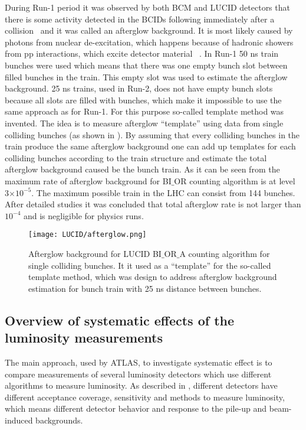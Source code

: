 During Run-1 period it was observed by both BCM and LUCID detectors that there is some activity detected in the BCIDs following immediately after a collision~\cite{Aad:2011dr,Aad:2013ucp}
and it was called an afterglow background. It is most likely caused by photons from nuclear de-excitation, which happens because of hadronic showers from pp interactions, which excite detector material ~\cite{Aaboud:2016hhf}.
In Run-1 50 ns train bunches were used which means that there was one empty bunch slot between filled bunches in the train.
This empty slot was used to estimate the afterglow background.
25 ns trains, used in Run-2, does not have empty bunch slots because all slots are filled with bunches, which make it impossible to use the same approach as for Run-1.
For this purpose so-called template method was invented. The idea is to measure afterglow ``template'' using data from single colliding bunches (as shown in ).
By assuming that every colliding bunches in the train produce the same afterglow background one can add up templates for each colliding bunches according to the train structure and estimate the total afterglow background caused be the bunch train. As it can be seen from  the maximum rate of afterglow background for BI$\_$OR counting algorithm is at level 
3$\times10^{-5}$. The maximum possible train in the LHC can consist from 144 bunches. After detailed studies it was concluded that total afterglow rate is not larger than $10^{-4}$ and is 
negligible for physics runs.
\begin{figure}
\centering
\texttt{[image: LUCID/afterglow.png]}
\caption{Afterglow background for LUCID BI$\_$OR$\_$A counting algorithm for single colliding bunches. It it used as a ``template'' for the so-called template method, which was design
to address afterglow background estimation for bunch train with 25 ns distance between bunches.}
\label{fig:afterglow}
\end{figure}

\subsection{Overview of systematic effects of the luminosity measurements}

The main approach, used by ATLAS, to investigate systematic effect is to compare measurements of several luminosity detectors which use different algorithms to measure luminosity.
As described in , different detectors have different acceptance coverage, sensitivity and methods to measure luminosity, which means different detector behavior and response to the pile-up and beam-induced backgrounds.

